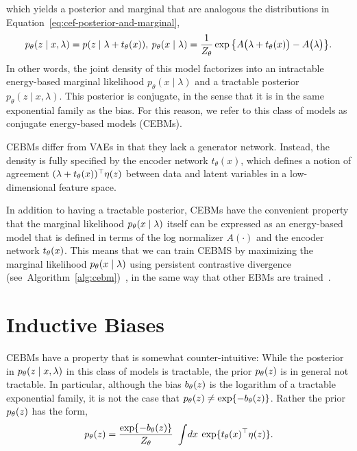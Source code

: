 \documentclass[tablecaption=bottom,wcp]{jmlr} %
\begin{document}
which yields a posterior and marginal that are analogous the distributions in Equation~\ref{eq:cef-posterior-and-marginal},
\begin{align}
    p_\theta(z \mid x, \lambda) = p(z \mid \lambda + t_\theta(x)), \:
    p_\theta(x \mid \lambda) = \frac{1}{Z_\theta} \exp\big\{ A\big(\lambda + t_\theta(x) \big) - A\big(\lambda\big) \big\}.
\end{align}
In other words, the joint density of this model factorizes into an intractable energy-based marginal likelihood $p_\theta(x \mid \lambda)$ and a tractable posterior $p_\theta(z \mid x, \lambda)$. This posterior is conjugate, in the sense that it is in the same exponential family as the bias. For this reason, we refer to this class of models as conjugate energy-based models (CEBMs).

CEBMs differ from VAEs in that they lack a generator network. Instead, the density is fully specified by the encoder network $t_\theta(x)$, which defines a notion of agreement $(\lambda + t_\theta(x))^\top \eta(z)$ between data and latent variables in a low-dimensional feature space.  

In addition to having a tractable posterior, CEBMs have the convenient property that the marginal likelihood $p_\theta(x \mid \lambda)$ itself can be expressed as an energy-based model that is defined in terms of the log normalizer $A(\cdot)$ and the encoder network $t_\theta(x)$. This means that we can train CEBMS by maximizing the marginal likelihood $p_\theta(x \mid \lambda)$ using persistent contrastive divergence (see~Algorithm~\ref{alg:cebm})~\cite{tieleman2008training}, in the same way that other EBMs are trained~\cite{nijkamp2019anatomy, du2019implicit,grathwohl2019your}. 
\section{Inductive Biases}
CEBMs have a property that is somewhat counter-intuitive: While the posterior in $p_\theta(z \mid x, \lambda)$ in this class of models is tractable, the prior $p_\theta(z)$ is in general not tractable. In particular, although the bias $b_\theta(z)$ is the logarithm of a tractable exponential family, it is not the case that $p_\theta(z) \not= \exp \{-b_\theta(z) \}$. Rather the prior $p_\theta(z)$ has the form,
\begin{align*}
    p_\theta(z) = \frac{\exp \{-b_\theta(z)\}}{Z_\theta} \ \int \! dx \: \exp \{t_\theta(x)^\top \eta(z) \}.
\end{align*}
\end{document}
